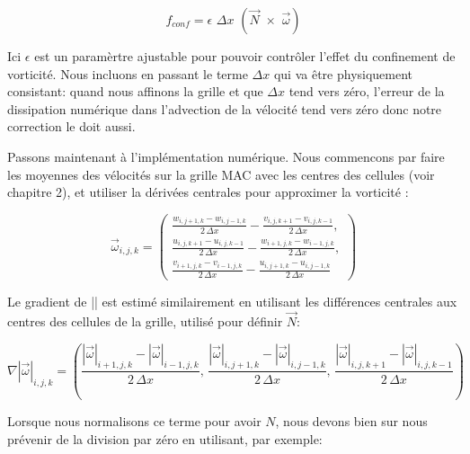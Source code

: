 \documentclass[11pt]{report}
\begin{document}
\begin{equation}
f_{conf} = \epsilon \,\, \Delta x \,\, (\overrightarrow{N} \,\, \times \,\, \overrightarrow{\omega})
\end{equation}

Ici $\epsilon$ est un paramèrtre ajustable pour pouvoir contrôler l'effet du confinement de vorticité. Nous incluons en passant le terme $\Delta x$ qui va être physiquement consistant: quand nous affinons la grille et que $\Delta x$ tend vers zéro, l'erreur de la dissipation numérique dans l'advection de la vélocité tend vers zéro donc notre correction le doit aussi.\newline

Passons maintenant à l'implémentation numérique. Nous commencons par faire les moyennes des vélocités sur la grille MAC avec les centres des cellules (voir chapitre 2), et utiliser la dérivées centrales pour approximer la vorticité :

\begin{equation}
\overrightarrow{\omega}_{i,j,k} = 
	\left(
		\begin{array}{c}
			\frac{w_{i,j+1,k} - w_{i,j-1,k}}{2\,\Delta x} - \frac{v_{i,j,k+1} - v_{i,j,k-1}}{2\,\Delta x}, \\
			\frac{u_{i,j,k+1} - u_{i,j,k-1}}{2\,\Delta x} - \frac{w_{i+1,j,k} - w_{i-1,j,k}}{2\,\Delta x}, \\
	 		\frac{v_{i+1,j,k} - v_{i-1,j,k}}{2\,\Delta x} - \frac{u_{i,j+1,k} - u_{i,j-1,k}}{2\,\Delta x}
		\end{array}
	\right)
\end{equation}

Le gradient de |\overrightarrow{\omega}| est estimé similairement en utilisant les différences centrales aux centres des cellules de la grille, utilisé pour définir $\overrightarrow{N}$:

\begin{equation}
\nabla |\overrightarrow{\omega}| _{i,j,k} = 
	\left(
		\frac{|\overrightarrow{\omega}|_{i+1,j,k} - |\overrightarrow{\omega}|_{i-1,j,k} }{2 \,\Delta x},\,
		\frac{|\overrightarrow{\omega}|_{i,j+1,k} - |\overrightarrow{\omega}|_{i,j-1,k} }{2 \,\Delta x},\,
		\frac{|\overrightarrow{\omega}|_{i,j,k+1} - |\overrightarrow{\omega}|_{i,j,k-1} }{2 \,\Delta x}
 	\right)
\end{equation}

Lorsque nous normalisons ce terme pour avoir $N$, nous devons bien sur nous prévenir de la division par zéro en utilisant, par exemple:
\end{document}
